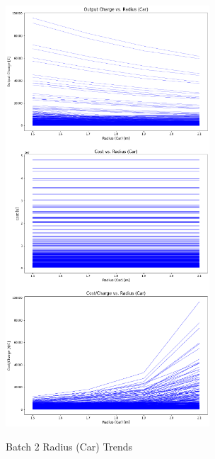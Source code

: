 \begin{figure}
    \begin{center}
    \includegraphics[width=3in]{fig27.png}
    \end{center}
    \renewcommand{\baselinestretch}{1}
    \small\normalsize
    \begin{quote}
    \caption[Batch 2 Radius (Car) Trends]{Batch 2 Radius (Car) Trends} \label{fig: f27}
    \end{quote}
\end{figure}

